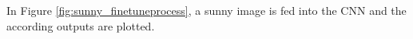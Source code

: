 In Figure \ref{fig:sunny_finetuneprocess}, a sunny image is fed into the CNN and the according outputs are plotted.

\begin{figure}[!htb]
    \centering
\end{figure}
